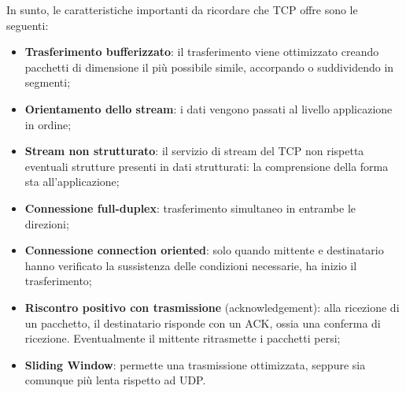 \documentclass{article}
\begin{document}
        In sunto, le caratteristiche importanti da ricordare che TCP offre sono le seguenti:
        \begin{itemize}
            \item \textbf{Trasferimento bufferizzato}: il trasferimento viene ottimizzato creando pacchetti di
            dimensione il più possibile simile, accorpando o suddividendo in segmenti;
            \item \textbf{Orientamento dello stream}: i dati vengono passati al livello applicazione in ordine;
            \item \textbf{Stream non strutturato}: il servizio di stream del TCP non rispetta eventuali strutture
            presenti in dati strutturati: la comprensione della forma sta all’applicazione;
            \item \textbf{Connessione full-duplex}: trasferimento simultaneo in entrambe le direzioni;
            \item \textbf{Connessione connection oriented}: solo quando mittente e destinatario hanno
            verificato la sussistenza delle condizioni necessarie, ha inizio il trasferimento;
            \item \textbf{Riscontro positivo con trasmissione} (acknowledgement): alla ricezione di un
            pacchetto, il destinatario risponde con un ACK, ossia una conferma di ricezione.
            Eventualmente il mittente ritrasmette i pacchetti persi;
            \item \textbf{Sliding Window}: permette una trasmissione ottimizzata, seppure sia comunque più
            lenta rispetto ad UDP.
        \end{itemize}
\end{document}
